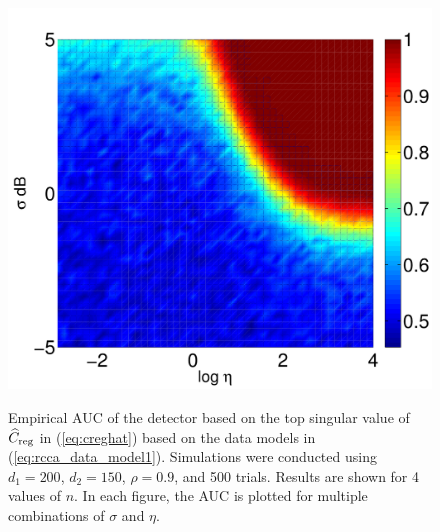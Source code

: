\begin{figure}[h!]
{\includegraphics[width=\figwidth]{figures/rcca_auc_heatmap_n_300.pdf} 
} 
\caption{Empirical AUC of the detector based on the top singular value of $\widehat{C}_{\text{reg}}$ in
  (\ref{eq:creghat}) based on the data models in (\ref{eq:rcca_data_model1}). Simulations
  were conducted using $d_1=200$, $d_2=150$, $\rho=0.9$, and 500 trials. Results are
  shown for 4 values of $n$. In each figure, the AUC is plotted for multiple combinations
  of $\sigma$ and $\eta$.}
\label{fig:rcca_auc_heatmap}
\end{figure}

